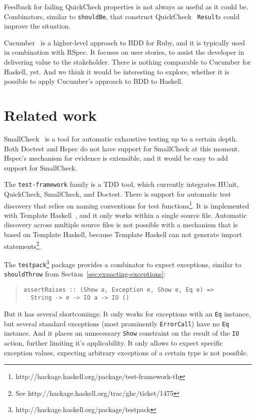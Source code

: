 \documentclass[preprint]{sigplanconf}
\begin{document}
Feedback for failing QuickCheck properties is not always as useful as
it could be.
Combinators, similar to {\tt shouldBe}, that construct QuickCheck {\tt
Result}s could improve the situation.

Cucumber~\cite{cucumber} is a higher-level approach to BDD for Ruby, and
it is typically used in combination with RSpec.
It focuses on user stories, to assist the developer in delivering
value to the stakeholder.
There is nothing comparable to Cucumber for Haskell, yet.  And we think
it would be interesting to explore, whether it is possible to apply
Cucumber's approach to BDD to Haskell.


\section{Related work}

SmallCheck~\cite{smallcheck} is a tool for
automatic exhaustive testing up to a certain depth.
Both Doctest and Hspec do not have support for SmallCheck
at this moment.
Hspec's mechanism for evidence is extensible, and it would be easy to
add support for SmallCheck.

The {\tt test-framework} family is a TDD tool, which currently
integrates HUnit, QuickCheck, SmallCheck, and Doctest.
There is support for automatic test discovery that relies on naming
conventions for test functions\footnote{%
http://hackage.haskell.org/package/test-framework-th}.  It is
implemented with Template Haskell~\cite{template-haskell}, and it only
works within a single source file.  Automatic discovery across
multiple source files is not possible with a mechanism that is based
on Template Haskell, because Template Haskell can not generate import
statements\footnote{%
See http://hackage.haskell.org/trac/ghc/ticket/1475 }.

The {\tt testpack}\footnote{%
http://hackage.haskell.org/package/testpack}
package provides a combinator to expect exceptions,
similar to {\tt shouldThrow} from
Section~\ref{sec:expacting-exceptions}:

\begin{quote}
\small
\begin{verbatim}
assertRaises :: (Show a, Exception e, Show e, Eq e) =>
  String -> e -> IO a -> IO ()
\end{verbatim}
\end{quote}

\noindent But it has several shortcomings:
It only works for exceptions with an {\tt Eq} instance,
but several standard exceptions (most
prominently {\tt ErrorCall}) have no {\tt Eq} instance.
And it places an unnecessary {\tt Show} constraint on the
result of the {\tt IO} action, further limiting it's applicability.
It only allows to expect specific exception values, expecting
arbitrary exceptions of a certain type is not possible.
\end{document}
